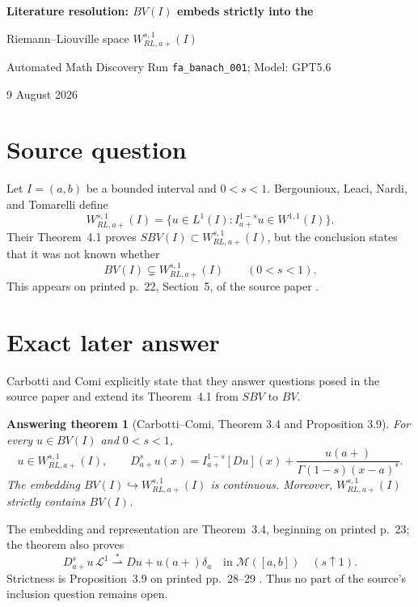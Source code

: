 \documentclass[10pt]{article}
\newtheorem*{answer}{Answering theorem}
\begin{document}
\begin{center}
{\Large\bfseries Literature resolution: $BV(I)$ embeds strictly into the\par
Riemann--Liouville space $W^{s,1}_{RL,a+}(I)$\par}
\medskip
Automated Math Discovery Run \texttt{fa\_banach\_001}; Model: GPT5.6\par
9 August 2026
\end{center}
\medskip

\begin{center}
\end{center}

\section*{Source question}
Let $I=(a,b)$ be a bounded interval and $0<s<1$.  Bergounioux, Leaci,
Nardi, and Tomarelli define
\[
 W^{s,1}_{RL,a+}(I)
 =\{u\in L^1(I): I_{a+}^{1-s}u\in W^{1,1}(I)\}.
\]
Their Theorem~4.1 proves $SBV(I)\subset W^{s,1}_{RL,a+}(I)$, but the
conclusion states that it was not known whether
\[
 BV(I)\subsetneq W^{s,1}_{RL,a+}(I)
 \qquad(0<s<1).
\]
This appears on printed p.~22, Section~5, of the source paper
\cite[p.~22, Section~5]{BLNT}.

\section*{Exact later answer}
Carbotti and Comi explicitly state that they answer questions posed in the
source paper and extend its Theorem~4.1 from $SBV$ to $BV$.

\begin{answer}[Carbotti--Comi, Theorem 3.4 and Proposition 3.9]
For every $u\in BV(I)$ and $0<s<1$,
\[
 u\in W^{s,1}_{RL,a+}(I),\qquad
 D^s_{a+}u(x)=I^{1-s}_{a+}[Du](x)
 +\frac{u(a+)}{\Gamma(1-s)(x-a)^s}.
\]
The embedding $BV(I)\hookrightarrow W^{s,1}_{RL,a+}(I)$ is continuous.
Moreover, $W^{s,1}_{RL,a+}(I)$ strictly contains $BV(I)$.
\end{answer}

The embedding and representation are Theorem~3.4, beginning on printed
p.~23; the theorem also proves
\[
 D^s_{a+}u\,\mathcal L^1 \stackrel{*}{\rightharpoonup}
 Du+u(a+)\delta_a
 \quad\text{in }\mathcal M([a,b])\quad(s\uparrow1).
\]
Strictness is Proposition~3.9 on printed pp.~28--29
\cite[Theorem~3.4 and Proposition~3.9]{CC}.  Thus no part of the source's
inclusion question remains open.
\end{document}
